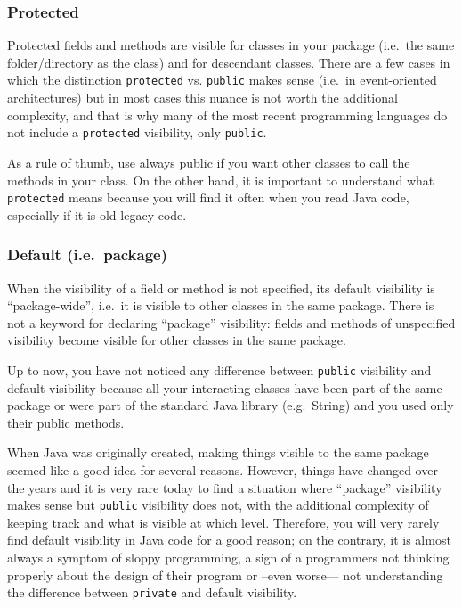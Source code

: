 \subsubsection{Protected}
\label{sec:protected}

Protected fields and methods are visible for classes in your package
(i.e.~the same folder/directory as the class) and for descendant
classes. There are a few cases in which the distinction
\verb+protected+ vs. \verb+public+ makes sense (i.e.~in event-oriented
architectures) but in most cases this nuance is not worth the
additional complexity, and that
is why many of the most recent programming languages do not include a
\verb+protected+ visibility, only \verb+public+. 

As a rule of thumb, use always public if you want other classes to
call the methods in your class. On the other hand, it is important to understand
what \verb+protected+ means because you will find it often when you
read Java code, especially if it is old legacy code. 

\subsubsection{Default (i.e.~package)}
\label{sec:default-i.e.-package}


When the visibility of a field or method is not specified, its default
visibility is ``package-wide'', i.e.~it is visible to other classes in
the same package. There is not a keyword for declaring ``package''
visibility: fields and methods of unspecified visibility become
visible for other classes in the same package. 

Up to now, you have not noticed any difference
between \verb+public+ visibility and default visibility because all
your interacting classes have been part of the same package or were
part of the standard Java library (e.g.~String) and you used only
their public methods. 

When Java was originally created, making things visible to the same
package seemed like a good idea for several reasons. However, things
have changed over the years and it is very rare today to find a
situation where ``package'' visibility makes sense but \verb+public+
visibility does not, with the additional complexity of keeping track
and what is visible at which level. Therefore, you will very rarely
find default visibility in Java code for a good reason; on the
contrary, it is almost
always a symptom of sloppy programming, a sign of a programmers not
thinking properly about the design of their program or --even worse---
not understanding the difference between \verb+private+ and default
visibility.   

